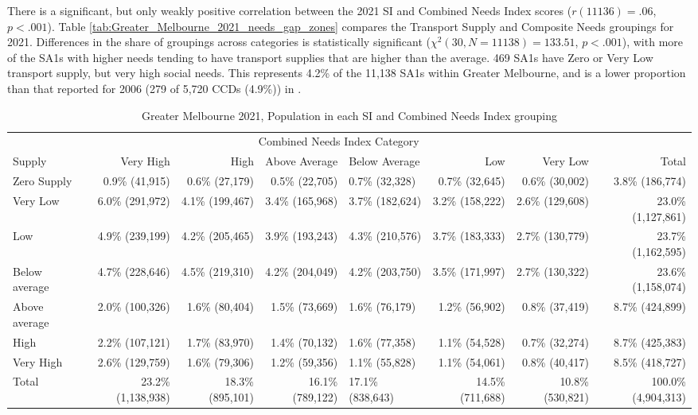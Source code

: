 \documentclass[preprint, 3p,
authoryear]{elsarticle} %
\begin{document}
There is a significant, but only weakly positive correlation between the
2021 SI and Combined Needs Index scores (\(r(11136) = .06\),
\(p < .001\)). Table \ref{tab:Greater_Melbourne_2021_needs_gap_zones}
compares the Transport Supply and Composite Needs groupings for 2021.
Differences in the share of groupings across categories is statistically
significant (\(\chi^2(30, N = 11138) = 133.51\), \(p < .001\)), with
more of the SA1s with higher needs tending to have transport supplies
that are higher than the average. 469 SA1s have Zero or Very Low
transport supply, but very high social needs. This represents 4.2\% of
the 11,138 SA1s within Greater Melbourne, and is a lower proportion than
that reported for 2006 (279 of 5,720 CCDs (4.9\%)) in
\citet{currie2010identifying}.

\begingroup\fontsize{6}{8}\selectfont

\begin{longtable}[t]{lrrrlrrr}
\caption{\label{tab:Greater_Melbourne_2021_needs_gap_population}Greater Melbourne 2021, Population in each SI and Combined Needs Index grouping}\\
\toprule
\multicolumn{1}{c}{ } & \multicolumn{6}{c}{Combined Needs Index Category} & \multicolumn{1}{c}{ } \\
\cmidrule(l{3pt}r{3pt}){2-7}
Supply & Very High & High & Above Average & Below Average & Low & Very Low & Total\\
\midrule
Zero Supply & 0.9\%    (41,915) & 0.6\%  (27,179) & 0.5\%  (22,705) & 0.7\%  (32,328) & 0.7\%  (32,645) & 0.6\%  (30,002) & 3.8\%   (186,774)\\
Very Low & 6.0\%   (291,972) & 4.1\% (199,467) & 3.4\% (165,968) & 3.7\% (182,624) & 3.2\% (158,222) & 2.6\% (129,608) & 23.0\% (1,127,861)\\
Low & 4.9\%   (239,199) & 4.2\% (205,465) & 3.9\% (193,243) & 4.3\% (210,576) & 3.7\% (183,333) & 2.7\% (130,779) & 23.7\% (1,162,595)\\
Below average & 4.7\%   (228,646) & 4.5\% (219,310) & 4.2\% (204,049) & 4.2\% (203,750) & 3.5\% (171,997) & 2.7\% (130,322) & 23.6\% (1,158,074)\\
Above average & 2.0\%   (100,326) & 1.6\%  (80,404) & 1.5\%  (73,669) & 1.6\%  (76,179) & 1.2\%  (56,902) & 0.8\%  (37,419) & 8.7\%   (424,899)\\
\addlinespace
High & 2.2\%   (107,121) & 1.7\%  (83,970) & 1.4\%  (70,132) & 1.6\%  (77,358) & 1.1\%  (54,528) & 0.7\%  (32,274) & 8.7\%   (425,383)\\
Very High & 2.6\%   (129,759) & 1.6\%  (79,306) & 1.2\%  (59,356) & 1.1\%  (55,828) & 1.1\%  (54,061) & 0.8\%  (40,417) & 8.5\%   (418,727)\\
Total & 23.2\% (1,138,938) & 18.3\% (895,101) & 16.1\% (789,122) & 17.1\% (838,643) & 14.5\% (711,688) & 10.8\% (530,821) & 100.0\% (4,904,313)\\
\bottomrule
\end{longtable}
\endgroup{}
\end{document}
